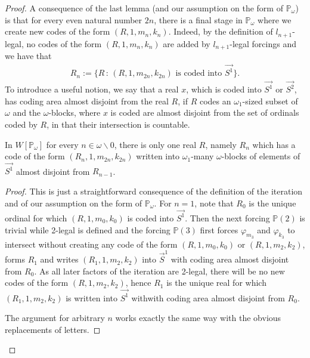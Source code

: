 \documentclass[10pt,a4paper]{amsart}
\newcommand{\forceP}{\mathbb{P}}
\begin{document}
\begin{proof}
A consequence of the last lemma (and our assumption on the form of $\forceP_{\omega}$) is that for every even natural number $2n$, there is a final stage in $\forceP_{\omega}$ where we create new codes of the form $(R,1,m_{n},k_{n})$. Indeed, by the definition of $l_{n+1}$-legal, no codes of the form $(R,1,m_{n},k_{n})$ are added by $l_{n+1}$-legal forcings and we have that
\begin{align*}
R_{n}:=  \{ R \, : \,  (R, 1,m_{2n},k_{2n}) \text{ is coded into } \vec{S^1} \}.
\end{align*}
To introduce a useful notion, we say that a real $x$, which is coded into $\vec{S^1}$ or $\vec{S^2}$, has coding area almost disjoint from the real $R$, if $R$ codes an $\omega_1$-sized subset of $\omega$ and the $\omega$-blocks, where $x$ is coded are almost disjoint from the set of ordinals coded by $R$, in that their intersection is countable.

\begin{lemma}
In $W[\forceP_{\omega}]$ for every $n \in \omega \backslash 0$, there is only one real $R$, namely $R_{n}$ which has a code of the form $(R_n,1,m_{2n},k_{2n})$ written into $\omega_1$-many  $\omega$-blocks of elements of $\vec{S^1}$ almost disjoint from $R_{n-1}$.
\end{lemma}
\begin{proof}
This is just a straightforward consequence of the definition of the iteration and of our assumption on the form of $\forceP_{\omega}$.  For $n=1$, note that $R_0$ is the unique ordinal for which $(R,1,m_0,k_0)$ is coded into $\vec{S^1}$. Then the next forcing $\forceP(2)$ is trivial while 2-legal is defined and the forcing $\forceP(3)$ first forces $\varphi_{m_3}$ and $\varphi_{k_3}$ to intersect without creating any code of the form $(R,1,m_0,k_0)$ or $(R,1,m_2,k_2)$, forms $R_1$ and writes $(R_1,1,m_2,k_2)$ into $\vec{S}^1$ with coding area almost disjoint from $R_0$. As all later factors of the iteration are 2-legal, there will be no new codes of the form $(R,1,m_2,k_2)$, hence $R_1$ is the unique real for which $(R_1,1,m_2,k_2)$ is written into $\vec{S^1}$ withwith coding area almost disjoint from $R_0$.

The argument for arbitrary $n$ works exactly the same way with the obvious replacements of letters.


\end{proof}
\end{proof}
\end{document}
